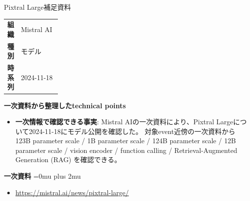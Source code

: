 \begin{technicalnote}{Pixtral Large}{補足資料}
\begingroup
\begin{tabularx}{\linewidth}{@{}>{\bfseries}p{0.22\linewidth}X@{}}
組織 & Mistral AI \\
種別 & モデル \\
時系列 & 2024-11-18 \\
\end{tabularx}
\smallskip
{\bfseries 一次資料から整理したtechnical points}
\begin{itemize}[leftmargin=1.5em,itemsep=0.35em]
\item \textbf{一次情報で確認できる事実}: Mistral AIの一次資料により、Pixtral Largeについて2024-11-18にモデル公開を確認した。 対象event近傍の一次資料から 123B parameter scale / 1B parameter scale / 124B parameter scale / 12B parameter scale / vision encoder / function calling / Retrieval-Augmented Generation (RAG) を確認できる。
\end{itemize}
\begin{minipage}{\linewidth}
\begin{samepage}
{\bfseries 一次資料}
\begingroup\sloppy
\Urlmuskip=0mu plus 2mu\relax
\begin{itemize}[leftmargin=1.5em,itemsep=0.25em]
\item {\scriptsize\url{https://mistral.ai/news/pixtral-large/}}
\end{itemize}
\endgroup
\end{samepage}
\end{minipage}
\endgroup
\end{technicalnote}
\medskip
